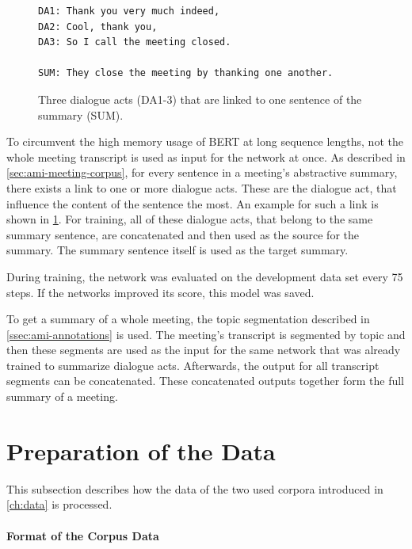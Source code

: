 \begin{figure}[h]
\begin{lstlisting}[numbers=none]
DA1: Thank you very much indeed,
DA2: Cool, thank you,
DA3: So I call the meeting closed.

SUM: They close the meeting by thanking one another.
\end{lstlisting}
\caption{Three dialogue acts (DA1-3) that are linked to one sentence of the summary (SUM).}
\label{fig:dialogue-arc-summary-link-example}
\end{figure}

To circumvent the high memory usage of BERT at long sequence lengths, not the whole meeting transcript is used as input for the network at once.
As described in \cref{sec:ami-meeting-corpus}, for every sentence in a meeting's abstractive summary, there exists a link to one or more dialogue acts.
These are the dialogue act, that influence the content of the sentence the most.
An example for such a link is shown in \cref{fig:dialogue-arc-summary-link-example}.
For training, all of these dialogue acts, that belong to the same summary sentence, are concatenated and then used as the source for the summary.
The summary sentence itself is used as the target summary.

During training, the network was evaluated on the development data set every 75 steps.
If the networks improved its score, this model was saved.

To get a summary of a whole meeting, the topic segmentation described in \cref{ssec:ami-annotations} is used.
The meeting's transcript is segmented by topic and then these segments are used as the input for the same network that was already trained to summarize dialogue acts.
Afterwards, the output for all transcript segments can be concatenated.
These concatenated outputs together form the full summary of a meeting. 

\section{Preparation of the Data}

This subsection describes how the data of the two used corpora introduced in \cref{ch:data} is processed.

\paragraph{Format of the Corpus Data}

